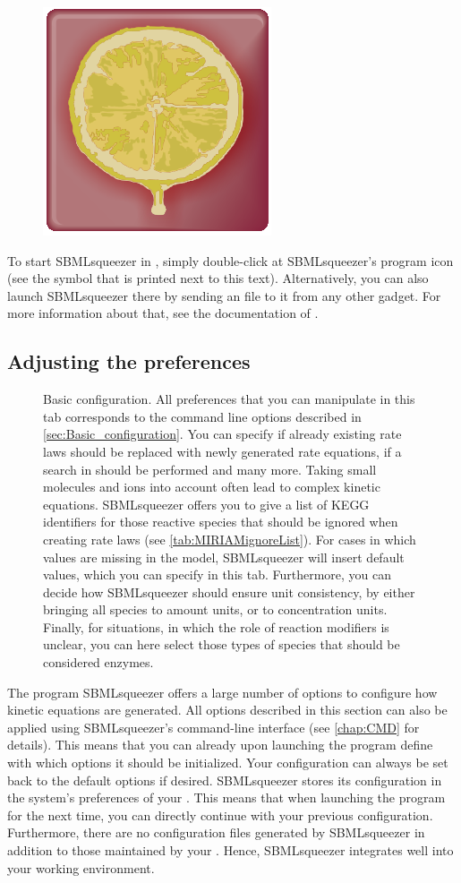 \begin{figure}
\includegraphics[width=.8cm]{img/LOGO}
\end{figure}
To start SBMLsqueezer in \Garuda, simply double-click at SBMLsqueezer's program icon (see the symbol that is printed next to this text).
Alternatively, you can also launch SBMLsqueezer there by sending an \SBML file to it from any other \Garuda gadget.
For more information about that, see the documentation of \Garuda.

\subsection{Adjusting the preferences}
\label{sec:GUIPrefs}
\begin{figure}
\caption{Basic configuration.
All preferences that you can manipulate in this
tab corresponds to the command line options described in
\vref{sec:Basic_configuration}. You can specify if already existing rate laws
should be replaced with newly generated rate equations, if a search in \SABIO
should be performed and many more.
Taking small molecules and ions into account often lead to complex kinetic equations.
SBMLsqueezer offers you to give a list of KEGG identifiers for those reactive
species that should be ignored when creating rate laws (see \vref{tab:MIRIAMignoreList}).
For cases in which values are missing in the
model, SBMLsqueezer will insert default values, which you can specify in this
tab. Furthermore, you can decide how SBMLsqueezer should ensure unit consistency,
by either bringing all species to amount units, or to concentration units.
Finally, for situations, in which the role of reaction modifiers is unclear, you
can here select those types of species that should be considered enzymes.}
\label{fig:Basic_Configuration}
\end{figure}
The program SBMLsqueezer offers a large number of options to configure how
kinetic equations are generated.
All options described in this section can also be applied using SBMLsqueezer's
command-line interface (see \vref{chap:CMD} for details).
This means that you can already upon launching the program define with which
options it should be initialized.
Your configuration can always be set back to the default options if desired.
SBMLsqueezer stores its configuration in the system's preferences of your \OS.
This means that when launching the program for the next time, you can directly
continue with your previous configuration.
Furthermore, there are no configuration files generated by SBMLsqueezer in
addition to those maintained by your \OS.
Hence, SBMLsqueezer integrates well into your working environment.

